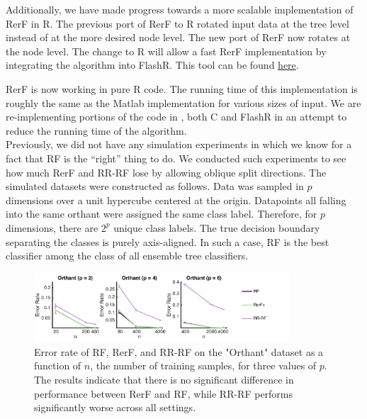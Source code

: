 \documentclass[simplex.tex]{subfiles}
\begin{document}
Additionally, we have made progress towards a more scalable implementation of RerF in R. The previous port of RerF to R rotated input data at the tree level instead 
of at the more desired node level.  The new port of RerF now rotates at the
node level.  The change to R will allow a fast RerF implementation by 
integrating the algorithm into FlashR.  This tool can be found \href{https://github.com/neurodata/R-RerF}{here}.


\clearpage

RerF is now working in pure R code.  The running time of this
implementation is roughly the same as the Matlab implementation for
various sizes of input.  We are re-implementing portions of the code in
, both C and FlashR in an attempt to reduce the running time of the
algorithm. \\


Previously, we did not have any simulation experiments in which we know
for a fact that RF is the ``right'' thing to do. We conducted such
experiments to see how much RerF and RR-RF lose by allowing oblique
split directions. The simulated datasets were constructed as follows.
Data was sampled in $p$ dimensions over a unit hypercube centered at the
origin. Datapoints all falling into the same orthant were assigned the
same class label. Therefore, for $p$ dimensions, there are $2^p$ unique
class labels. The true decision boundary separating the classes is
purely axis-aligned. In such a case, RF is the best classifier among the
class of all ensemble tree classifiers.

\begin{figure}[!h]
\begin{cframed}
\centering
\includegraphics[width=0.85\textwidth]{../../figs/RerF_2017_02.png}
\caption{Error rate of RF, RerF, and RR-RF on the "Orthant" dataset as a
  function of $n$, the number of training samples, for three values of
  $p$. The results indicate that there is no significant difference in
  performance between RerF and RF, while RR-RF performs significantly
  worse across all settings.}
\label{fig:name}
\end{cframed}
\end{figure}
\end{document}
